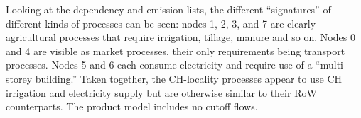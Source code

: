 Looking at the dependency and emission lists, the different ``signatures'' of different kinds of processes can be seen: nodes 1, 2, 3, and 7 are clearly agricultural processes that require irrigation, tillage, manure and so on.  Nodes 0 and 4 are visible as market processes, their only requirements being transport processes.  Nodes 5 and 6 each consume electricity and require use of a ``multi-storey building.''  Taken together, the CH-locality processes appear to use CH irrigation and electricity supply but are otherwise similar to their RoW counterparts.  The product model includes no cutoff flows.

